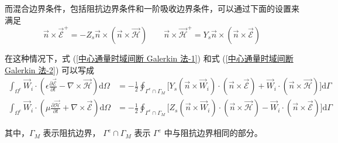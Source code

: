 \par 而混合边界条件，包括阻抗边界条件和一阶吸收边界条件，可以通过下面的设置来满足
\begin{equation}
    \vec{n}\times\vec{\mathscr{E}}^+=
    -Z_s\vec{n}\times
    (\vec{n}\times\vec{\mathscr{H}})
    \qquad
    \vec{n}\times\vec{\mathscr{H}}^+=
    Y_s\vec{n}\times
    (\vec{n}\times\vec{\mathscr{E}})
\end{equation}
\par 在这种情况下，式 (\ref{中心通量时域间断 Galerkin 法-1}) 和式 (\ref{中心通量时域间断 Galerkin 法-2})
可以写成
\begin{align}
    \int_{\Omega^e}\vec{W}_i\cdot\left(
        \epsilon\frac{\partial\vec{\mathscr{E}}}{\partial t}
        -\nabla\times\vec{\mathscr{H}}
    \right)\text{d}\Omega
    &=-\frac{1}{2}\oint_{\Gamma^e\cap\Gamma_M}
    \Big[
        Y_s(\vec{n}\times\vec{W}_i)\cdot
        (\vec{n}\times\vec{\mathscr{E}})
        +\vec{W}_i\cdot
        (\vec{n}\times\vec{\mathscr{H}})
    \Big]\text{d}\Gamma\\
    \int_{\Omega^e}\vec{W}_i\cdot\left(
        \mu\frac{\partial\vec{\mathscr{H}}}{\partial t}
        +\nabla\times\vec{\mathscr{E}}
    \right)\text{d}\Omega
    &=-\frac{1}{2}\oint_{\Gamma^e\cap\Gamma_M}
    \Big[
        Z_s(\vec{n}\times\vec{W}_i)\cdot
        (\vec{n}\times\vec{\mathscr{H}})
        -\vec{W}_i\cdot
        (\vec{n}\times\vec{\mathscr{E}})
    \Big]\text{d}\Gamma
\end{align}
\par 其中，$\Gamma_M$ 表示阻抗边界，
$\Gamma^e\cap\Gamma_M$ 表示 $\Gamma^e$ 中与阻抗边界相同的部分。

